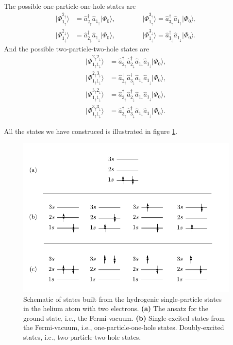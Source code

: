 \documentclass[a4paper, 11pt, notitlepage, english]{article}
\newcommand{\ket}[1]{|#1 \rangle}
\newcommand{\op}[1]{\hat{#1}}
\renewcommand{\d}{{\rm d}}
\renewcommand{\u}{\uparrow}
\renewcommand{\d}{\downarrow}
\begin{document}
The possible one-particle-one-hole states are
\begin{align*}
\ket{\Phi_{1_\u}^{2_\u}} &= \op{a}_{2_\u}^\dagger \op{a}_{1_\u} \ket{\Phi_0}, \qquad\qquad
\ket{\Phi_{1_\u}^{3_\u}} = \op{a}_{3_\u}^\dagger \op{a}_{1_\u} \ket{\Phi_0}, \\
\ket{\Phi_{1_\d}^{2_\d}} &= \op{a}_{2_\d}^\dagger \op{a}_{1_\d} \ket{\Phi_0}, 
\qquad\qquad
\ket{\Phi_{1_\d}^{3_\d}} = \op{a}_{3_\d}^\dagger \op{a}_{1_\d} \ket{\Phi_0}.
\end{align*}
And the possible two-particle-two-hole states are
\begin{align*}
\ket{\Phi_{1_\u1_\d}^{2_\u2_\d}} &= \op{a}_{2_\u}^\dagger \op{a}_{2_\d}^\dagger \op{a}_{1_\u} \op{a}_{1_\d} \ket{\Phi_0}, \\
\ket{\Phi_{1_\u1_\d}^{2_\u3_\d}} &= \op{a}_{2_\u}^\dagger \op{a}_{3_\d}^\dagger \op{a}_{1_\u} \op{a}_{1_\d} \ket{\Phi_0}, \\
\ket{\Phi_{1_\u1_\d}^{3_\u2_\d}} &= \op{a}_{3_\u}^\dagger \op{a}_{2_\d}^\dagger \op{a}_{1_\u} \op{a}_{1_\d} \ket{\Phi_0}, \\
\ket{\Phi_{1_\u1_\d}^{3_\u3_\d}} &= \op{a}_{3_\u}^\dagger \op{a}_{3_\d}^\dagger \op{a}_{1_\u} \op{a}_{1_\d} \ket{\Phi_0}.
\end{align*}

All the states we have construced is illustrated in figure \ref{fig:1a}.


\begin{figure}[bhpt]
\includegraphics{project1a.pdf}
\caption{Schematic of states built from the hydrogenic single-particle states in the helium atom with two electrons. \textbf{(a)} The ansatz for the ground state, i.e., the Fermi-vacuum. \textbf{(b)} Single-excited states from the Fermi-vacuum, i.e., one-particle-one-hole states.  Doubly-excited states, i.e., two-particle-two-hole states. \label{fig:1a}}	
\end{figure}
\end{document}
